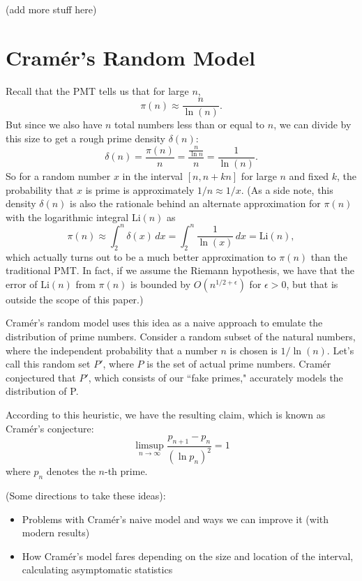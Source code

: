 \documentclass[12pt, letterpaper]{article}
\begin{document}
(add more stuff here)

\section{Cram\'er's Random Model}
Recall that the PMT tells us that for large $n$,
\[\pi(n) \approx \frac{n}{\ln(n)}.\]
But since we also have $n$ total numbers less than or equal to
$n$, we can divide by this size to get a rough prime density
$\delta(n)$:
\[\delta(n) = \frac{\pi(n)}{n} = \frac{\frac{n}{\ln{n}}}{n} = \frac{1}{\ln(n)}.\]
So for a random number $x$ in the interval $[n, n + kn]$ for
large $n$ and fixed $k$, the probability that $x$ is prime is
approximately $1 / n \approx 1 / x$. (As a side note, this
density $\delta(n)$ is also the rationale behind an alternate
approximation for $\pi(n)$ with the logarithmic integral
$\text{Li}(n)$ as
\[\pi(n) \approx \int_2^{n} \delta(x)\, dx = \int_2^{n} \frac{1}{\ln(x)}\, dx = \text{Li}(n),\]
which actually turns out to be a much better approximation to
$\pi(n)$ than the traditional PMT. In fact, if we assume the
Riemann hypothesis, we have that the error of $\text{Li}(n)$ from
$\pi(n)$ is bounded by $O(n^{1/2 + \epsilon})$ for
$\epsilon > 0$,
but that is outside the scope of this paper.)


Cram\'er's random model uses this idea as a naive approach to emulate the distribution of prime numbers. Consider a random subset of the natural numbers, where the independent probability that a number $n$ is chosen is $1 / \ln(n)$. Let's call this random set $P'$, where $P$ is the set of actual prime numbers. Cram\'er conjectured that $P'$, which consists of our ``fake primes," accurately models the distribution of P. 

According to this heuristic, we have the resulting claim, which is known as Cram\'er's conjecture:
\[\limsup_{n \to \infty} \frac{p_{n + 1} - p_n}{(\ln p_n)^2} = 1\]
where $p_n$ denotes the $n$-th prime.

(Some directions to take these ideas):
\begin{itemize}
  \item Problems with Cram\'er's naive model and ways we can improve it (with modern results)
  \item How Cram\'er's model fares depending on the size and location of the interval, calculating asymptomatic statistics
\end{itemize}
\end{document}
